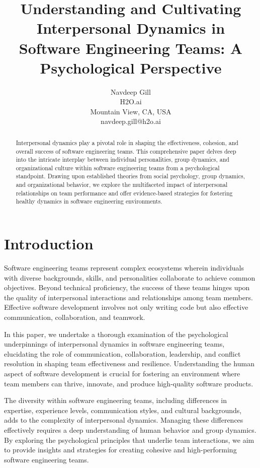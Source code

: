 \documentclass{article}
\title{Understanding and Cultivating Interpersonal Dynamics in Software Engineering Teams: A Psychological Perspective}
\author{Navdeep Gill\\
H2O.ai \\
Mountain View, CA, USA \\
navdeep.gill@h2o.ai}
\begin{document}
\maketitle

\begin{abstract}
Interpersonal dynamics play a pivotal role in shaping the effectiveness, cohesion, and overall success of software engineering teams. This comprehensive paper delves deep into the intricate interplay between individual personalities, group dynamics, and organizational culture within software engineering teams from a psychological standpoint. Drawing upon established theories from social psychology, group dynamics, and organizational behavior, we explore the multifaceted impact of interpersonal relationships on team performance and offer evidence-based strategies for fostering healthy dynamics in software engineering environments.
\end{abstract}

\section{Introduction}
Software engineering teams represent complex ecosystems wherein individuals with diverse backgrounds, skills, and personalities collaborate to achieve common objectives. Beyond technical proficiency, the success of these teams hinges upon the quality of interpersonal interactions and relationships among team members. Effective software development involves not only writing code but also effective communication, collaboration, and teamwork.

In this paper, we undertake a thorough examination of the psychological underpinnings of interpersonal dynamics in software engineering teams, elucidating the role of communication, collaboration, leadership, and conflict resolution in shaping team effectiveness and resilience. Understanding the human aspect of software development is crucial for fostering an environment where team members can thrive, innovate, and produce high-quality software products.

The diversity within software engineering teams, including differences in expertise, experience levels, communication styles, and cultural backgrounds, adds to the complexity of interpersonal dynamics. Managing these differences effectively requires a deep understanding of human behavior and group dynamics. By exploring the psychological principles that underlie team interactions, we aim to provide insights and strategies for creating cohesive and high-performing software engineering teams.
\end{document}
